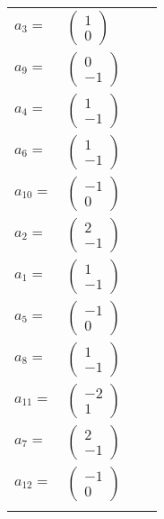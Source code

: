 \documentclass[1p]{elsarticle_modified}
\theoremstyle{definition}
\begin{document}
\begin{tabular}{m{7pt} m{180pt} m{7pt} m{180pt} }
\flushright $a_{3}=$&$\begin{pmatrix}1\\0\end{pmatrix}$ \\
\flushright $a_{9}=$&$\begin{pmatrix}0\\-1\end{pmatrix}$ \\
\flushright $a_{4}=$&$\begin{pmatrix}1\\-1\end{pmatrix}$ \\
\flushright $a_{6}=$&$\begin{pmatrix}1\\-1\end{pmatrix}$ \\
\flushright $a_{10}=$&$\begin{pmatrix}-1\\0\end{pmatrix}$ \\
\flushright $a_{2}=$&$\begin{pmatrix}2\\-1\end{pmatrix}$ \\
\flushright $a_{1}=$&$\begin{pmatrix}1\\-1\end{pmatrix}$ \\
\flushright $a_{5}=$&$\begin{pmatrix}-1\\0\end{pmatrix}$ \\
\flushright $a_{8}=$&$\begin{pmatrix}1\\-1\end{pmatrix}$ \\
\flushright $a_{11}=$&$\begin{pmatrix}-2\\1\end{pmatrix}$ \\
\flushright $a_{7}=$&$\begin{pmatrix}2\\-1\end{pmatrix}$ \\
\flushright $a_{12}=$&$\begin{pmatrix}-1\\0\end{pmatrix}$\\&\end{tabular}
\end{document}
